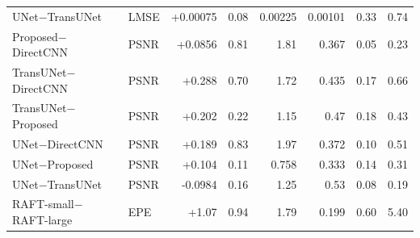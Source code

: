 \begin{table}[!t]
{\begin{tabular}{llrrrrrr}
UNet$-$TransUNet & LMSE & +0.00075 & 0.08 & 0.00225 & 0.00101 & 0.33 & 0.74 \\
Proposed$-$DirectCNN & PSNR & +0.0856 & 0.81 & 1.81 & 0.367 & 0.05 & 0.23 \\
TransUNet$-$DirectCNN & PSNR & +0.288 & 0.70 & 1.72 & 0.435 & 0.17 & 0.66 \\
TransUNet$-$Proposed & PSNR & +0.202 & 0.22 & 1.15 & 0.47 & 0.18 & 0.43 \\
UNet$-$DirectCNN & PSNR & +0.189 & 0.83 & 1.97 & 0.372 & 0.10 & 0.51 \\
UNet$-$Proposed & PSNR & +0.104 & 0.11 & 0.758 & 0.333 & 0.14 & 0.31 \\
UNet$-$TransUNet & PSNR & -0.0984 & 0.16 & 1.25 & 0.53 & 0.08 & 0.19 \\
RAFT-small$-$RAFT-large & EPE & +1.07 & 0.94 & 1.79 & 0.199 & 0.60 & 5.40 \\
\bottomrule\end{tabular}}\end{table}
